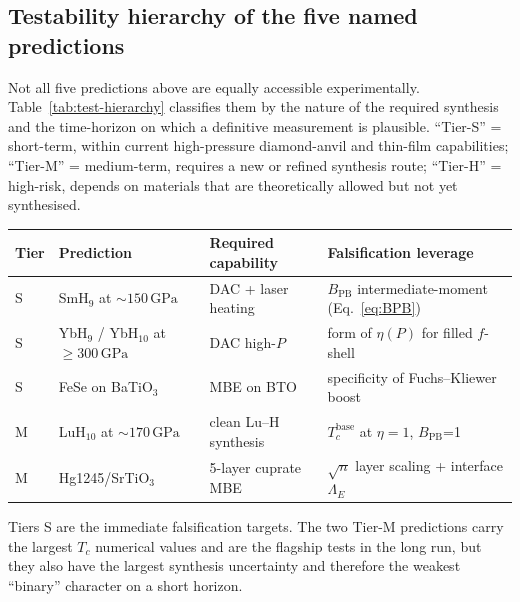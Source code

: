 \documentclass[11pt,a4paper]{article}
\newcommand{\BPB}{B_{\mathrm{PB}}}
\newcommand{\GPa}{\,\mathrm{GPa}}
\newcommand{\LamE}{\Lambda_{E}}
\begin{document}
\subsection{Testability hierarchy of the five named predictions}
\label{sec:test-hierarchy}

Not all five predictions above are equally accessible experimentally.
Table~\ref{tab:test-hierarchy} classifies them by the nature of the
required synthesis and the time-horizon on which a definitive
measurement is plausible. ``Tier-S'' = short-term, within current
high-pressure diamond-anvil and thin-film capabilities; ``Tier-M'' =
medium-term, requires a new or refined synthesis route; ``Tier-H'' =
high-risk, depends on materials that are theoretically allowed but
not yet synthesised.

\begin{center}\small
{}
\label{tab:test-hierarchy}
\begin{tabular}{@{}llll@{}}
\toprule
Tier & Prediction & Required capability & Falsification leverage\\
\midrule
\textsf{S} & SmH$_{9}$ at $\sim\!150\GPa$     & DAC + laser heating   & $\BPB$ intermediate-moment (Eq.~\eqref{eq:BPB})\\
\textsf{S} & YbH$_{9}$ / YbH$_{10}$ at $\geq\!300\GPa$ & DAC high-$P$ & form of $\eta(P)$ for filled $f$-shell\\
\textsf{S} & FeSe on BaTiO$_{3}$              & MBE on BTO            & specificity of Fuchs--Kliewer boost\\
\textsf{M} & LuH$_{10}$ at $\sim\!170\GPa$    & clean Lu--H synthesis & $T_{c}^{\mathrm{base}}$ at $\eta=1$, $\BPB$=1\\
\textsf{M} & Hg1245/SrTiO$_{3}$               & 5-layer cuprate MBE   & $\sqrt{n}$ layer scaling + interface $\LamE$\\
\bottomrule
\end{tabular}
\end{center}

\noindent
Tiers \textsf{S} are the immediate falsification targets. The two
Tier-\textsf{M} predictions carry the largest $T_{c}$ numerical values
and are the flagship tests in the long run, but they also have the
largest synthesis uncertainty and therefore the weakest
``binary'' character on a short horizon.
\end{document}
